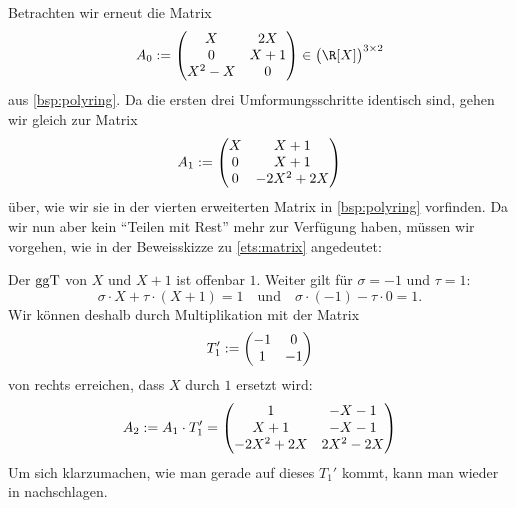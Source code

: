 \begin{thBeisp}
    Betrachten wir erneut die Matrix
    \[ A_0 := \Matrix{ X      &  2X   \\
                     0      &  X+1  \\
                     X^2-X  &  0     }  
    \in \bigl(\R[X]\bigr)^{3\times2}
    \]
    aus \cref{bsp:polyring}. Da die ersten drei Umformungsschritte identisch sind,
    gehen wir gleich zur Matrix
    \[ A_1 := \begin{pmatrix} 
            X     &  X+1  \\
            0     &  X+1  \\
            0 &  -2X^2+2X    \end{pmatrix} \]
    über, wie wir sie in der vierten erweiterten Matrix in \cref{bsp:polyring}
    vorfinden. Da wir nun aber kein \enquote{Teilen mit Rest} mehr zur Verfügung
    haben, müssen wir vorgehen, wie in der Beweisskizze zu \cref{ets:matrix}
    angedeutet:

    Der $\mathrm{ggT}$ von $X$ und $X+1$ ist offenbar $1$. Weiter gilt für
    $\sigma=-1$ und $\tau=1$:
    \[ \sigma \cdot X + \tau \cdot (X+1) = 1 \quad\text{und}\quad
        \sigma \cdot (-1) - \tau \cdot 0 = 1  .\]
    Wir können deshalb durch Multiplikation mit der Matrix
    \[ T_1' := \begin{pmatrix}  -1 & 0 \\ 1 & -1  \end{pmatrix} \]
    von rechts erreichen, dass $X$ durch $1$ ersetzt wird:
    \[ A_2 := A_1 \cdot T_1' 
        = \begin{pmatrix}     1      & -X-1 \\
                    X+1      & -X-1 \\
                    -2X^2+2X & 2X^2-2X  \end{pmatrix}     \]
    Um sich klarzumachen, wie man gerade auf dieses $T_1'$ kommt, kann man
    wieder in \cite[S.\,213\,f.]{bookc:bosch08} nachschlagen.


\end{thBeisp}
